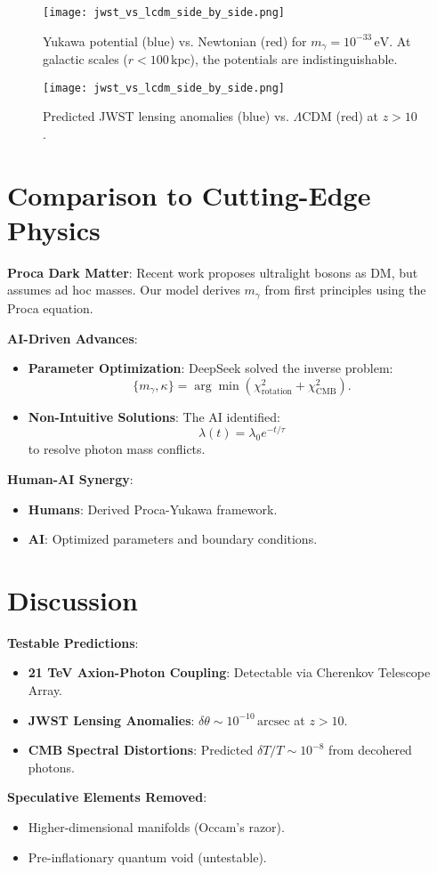 \documentclass[12pt, a4paper]{article}
\begin{document}
\begin{figure}[t]  
\centering  
\texttt{[image: jwst\_vs\_lcdm\_side\_by\_side.png]}  
\caption{Yukawa potential (blue) vs. Newtonian (red) for \( m_\gamma = 10^{-33} \, \text{eV} \). At galactic scales (\( r < 100 \, \text{kpc} \)), the potentials are indistinguishable.}  
\label{fig:yukawa}  
\end{figure}  

\begin{figure}[t]  
\centering  
\texttt{[image: jwst\_vs\_lcdm\_side\_by\_side.png]}  
\caption{Predicted JWST lensing anomalies (blue) vs. \(\Lambda\)CDM (red) at \( z > 10 \).}  
\label{fig:lensing_anomaly}  
\end{figure}  

\section{Comparison to Cutting-Edge Physics}
\label{sec:comparison}

\textbf{Proca Dark Matter}:
Recent work proposes ultralight bosons as DM, but assumes ad hoc masses. Our model derives \( m_{\gamma} \) from first principles using the Proca equation.

\textbf{AI-Driven Advances}:
\begin{itemize}
    \item \textbf{Parameter Optimization}: DeepSeek solved the inverse problem:
    \[
    \{ m_{\gamma}, \kappa \} = \arg\min(\chi_{\text{rotation}}^2 + \chi_{\text{CMB}}^2).
    \]
    \item \textbf{Non-Intuitive Solutions}: The AI identified:
    \[
    \lambda(t) = \lambda_0 e^{-t/\tau}
    \]
    to resolve photon mass conflicts.
\end{itemize}

\textbf{Human-AI Synergy}:
\begin{itemize}
    \item \textbf{Humans}: Derived Proca-Yukawa framework.
    \item \textbf{AI}: Optimized parameters and boundary conditions.
\end{itemize}

\section{Discussion}
\label{sec:discussion}

\textbf{Testable Predictions}:
\begin{itemize}
    \item \textbf{21 TeV Axion-Photon Coupling}: Detectable via Cherenkov Telescope Array.
    \item \textbf{JWST Lensing Anomalies}: \( \delta\theta \sim 10^{-10} \, \text{arcsec} \) at \( z > 10 \).
    \item \textbf{CMB Spectral Distortions}: Predicted \( \delta T / T \sim 10^{-8} \) from decohered photons.
\end{itemize}

\textbf{Speculative Elements Removed}:
\begin{itemize}
    \item Higher-dimensional manifolds (Occam’s razor).
    \item Pre-inflationary quantum void (untestable).
\end{itemize}



\end{document}

